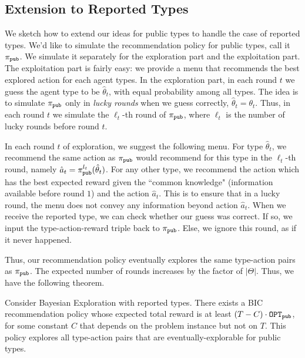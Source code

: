 
\subsection{Extension to Reported Types}
\label{sec:reported}

\newcommand{\pipub}{\pi_{\term{pub}}}

We sketch how to extend our ideas for public types to handle the case of reported types. We'd like to simulate the recommendation policy for public types, call it $\pipub$. We simulate it separately for the exploration part and the exploitation part. The exploitation part is fairly easy: we provide a menu that recommends the best explored action for each agent types. In the exploration part, in each round $t$ we guess the agent type to be $\hat{\theta}_t$, with equal probability among all types.
The idea is to simulate $\pipub$ only in \emph{lucky rounds} when we guess correctly, \ie $\hat{\theta}_t=\theta_t$. Thus,
in each round $t$ we simulate the $\ell_t$-th round of $\pipub$, where $\ell_t$ is the number of lucky rounds before round $t$.

In each round $t$ of exploration, we suggest the following menu. For type $\hat{\theta}_t$, we recommend the same action as $\pipub$ would recommend for this type in the $\ell_t$-th round, namely
    $\hat{a}_t = \pipub^{\ell_t}(\hat{\theta}_t)$.
For any other type, we recommend the action which has the best expected reward given the ``common knowledge" (information available before round $1$) and the action $\hat{a}_t$. This is to ensure that in a lucky round, the menu does not convey any information beyond action  $\hat{a}_t$. When we receive the reported type, we can check whether our guess was correct. If so, we input the type-action-reward triple back to $\pipub$. Else, we ignore this round, as if it never happened.

Thus, our recommendation policy eventually explores the same type-action pairs as $\pipub$. The expected number of rounds increases by the factor of $|\varTheta|$. Thus, we have the following theorem.

\begin{theorem}
\label{thm:reported}
Consider Bayesian Exploration with reported types.
There exists a BIC recommendation policy whose expected total reward is at least $\left(T - C \right) \cdot \mathtt{OPT}_{\mathtt{pub}}$,
for some constant $C$ that depends on the problem instance but not on $T$.
This policy explores all type-action pairs that are eventually-explorable 
for public types.
\end{theorem}

